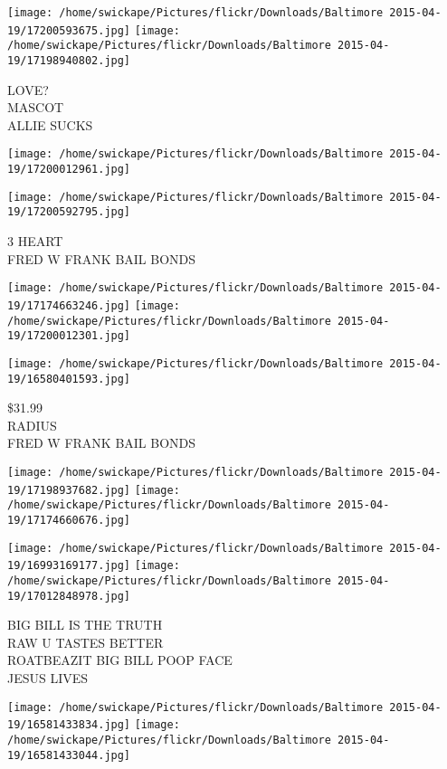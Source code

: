 \documentclass[10pt,letterpaper]{article}
\begin{document}
\vspace{0.25in}
\texttt{[image: /home/swickape/Pictures/flickr/Downloads/Baltimore 2015-04-19/17200593675.jpg]}
\texttt{[image: /home/swickape/Pictures/flickr/Downloads/Baltimore 2015-04-19/17198940802.jpg]}

LOVE?\\
MASCOT\\
ALLIE SUCKS
\pagebreak

\texttt{[image: /home/swickape/Pictures/flickr/Downloads/Baltimore 2015-04-19/17200012961.jpg]}

\vspace{0.25in}
\texttt{[image: /home/swickape/Pictures/flickr/Downloads/Baltimore 2015-04-19/17200592795.jpg]}

3 HEART\\
FRED W FRANK BAIL BONDS
\pagebreak

\texttt{[image: /home/swickape/Pictures/flickr/Downloads/Baltimore 2015-04-19/17174663246.jpg]}
\texttt{[image: /home/swickape/Pictures/flickr/Downloads/Baltimore 2015-04-19/17200012301.jpg]}

\vspace{0.25in}
\texttt{[image: /home/swickape/Pictures/flickr/Downloads/Baltimore 2015-04-19/16580401593.jpg]}

\$31.99\\
RADIUS\\
FRED W FRANK BAIL BONDS
\pagebreak

\texttt{[image: /home/swickape/Pictures/flickr/Downloads/Baltimore 2015-04-19/17198937682.jpg]}
\texttt{[image: /home/swickape/Pictures/flickr/Downloads/Baltimore 2015-04-19/17174660676.jpg]}

\texttt{[image: /home/swickape/Pictures/flickr/Downloads/Baltimore 2015-04-19/16993169177.jpg]}
\texttt{[image: /home/swickape/Pictures/flickr/Downloads/Baltimore 2015-04-19/17012848978.jpg]}

BIG BILL IS THE TRUTH\\
RAW U TASTES BETTER\\
ROATBEAZIT BIG BILL POOP FACE\\
JESUS LIVES
\pagebreak

\texttt{[image: /home/swickape/Pictures/flickr/Downloads/Baltimore 2015-04-19/16581433834.jpg]}
\texttt{[image: /home/swickape/Pictures/flickr/Downloads/Baltimore 2015-04-19/16581433044.jpg]}
\end{document}
